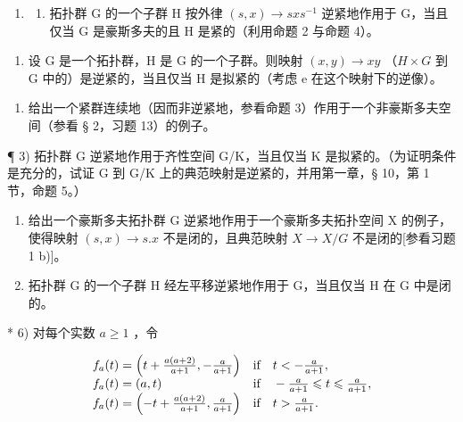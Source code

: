 \BourbakiExerciseGroup

\begin{enumerate}
\def\labelenumi{\arabic{enumi})}
\tightlist
\item
  \begin{enumerate}
  \def\labelenumii{\alph{enumii})}
  \tightlist
  \item
    拓扑群 G 的一个子群 H 按外律 \((s, x) \rightarrow sxs^{-1}\) 逆紧地作用于 G，当且仅当 G 是豪斯多夫的且 H 是紧的（利用命题 2 与命题 4）。
  \end{enumerate}
\end{enumerate}

\begin{enumerate}
\def\labelenumi{\alph{enumi})}
\setcounter{enumi}{1}
\tightlist
\item
  设 G 是一个拓扑群，H 是 G 的一个子群。则映射 \((x,y)\to xy\) （\(H\times G\) 到 G 中的）是逆紧的，当且仅当 H 是拟紧的（考虑 e 在这个映射下的逆像）。
\end{enumerate}

\begin{enumerate}
\def\labelenumi{\arabic{enumi})}
\setcounter{enumi}{1}
\tightlist
\item
  给出一个紧群连续地（因而非逆紧地，参看命题 3）作用于一个非豪斯多夫空间（参看 § 2，习题 13）的例子。
\end{enumerate}

¶ 3) 拓扑群 G 逆紧地作用于齐性空间 G/K，当且仅当 K 是拟紧的。（为证明条件是充分的，试证 G 到 G/K 上的典范映射是逆紧的，并用第一章，§ 10，第 1 节，命题 5。）

\begin{enumerate}
\def\labelenumi{\arabic{enumi})}
\setcounter{enumi}{3}
\item
  给出一个豪斯多夫拓扑群 G 逆紧地作用于一个豪斯多夫拓扑空间 X 的例子，使得映射 \((s, x) \rightarrow s.x\) 不是闭的，且典范映射 \(X \rightarrow X/G\) 不是闭的{[}参看习题 1 b){]}。
\item
  拓扑群 G 的一个子群 H 经左平移逆紧地作用于 G，当且仅当 H 在 G 中是闭的。
\end{enumerate}

* 6) 对每个实数 \(a \geqslant 1\) ，令

\[
\begin{array}{l l} f _ {a} (t) = \left(t + \frac {a (a + 2)}{a + 1}, - \frac {a}{a + 1}\right) & \text {if} \quad t <   - \frac {a}{a + 1}, \\ f _ {a} (t) = (a, t) & \text {if} \quad - \frac {a}{a + 1} \leqslant t \leqslant \frac {a}{a + 1}, \\ f _ {a} (t) = \left(- t + \frac {a (a + 2)}{a + 1}, \frac {a}{a + 1}\right) & \text {if} \quad t > \frac {a}{a + 1}. \end{array}
\]

